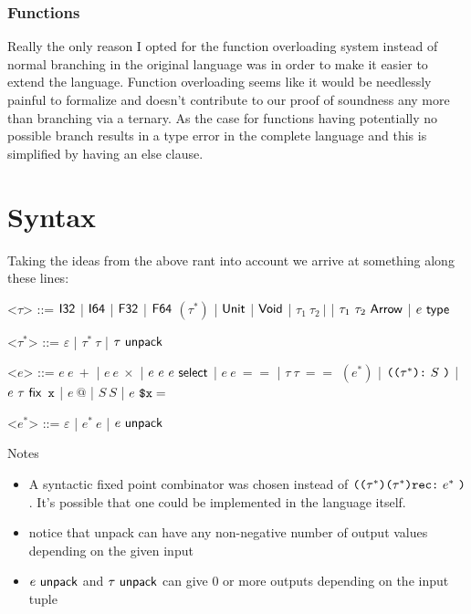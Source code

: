 \documentclass{article}
\begin{document}
\subsubsection{Functions}
Really the only reason I opted for the function overloading system instead of normal branching in the original language was in order to make it easier to extend the language.
Function overloading seems like it would be needlessly painful to formalize and doesn't contribute to our proof of soundness any more than branching via a ternary. As the case for functions having potentially no possible branch results in a type error in the complete language and this is simplified by having an else clause.

\section{Syntax}
Taking the ideas from the above rant into account we arrive at something along these lines:

\renewcommand{\grammarlabel}[2]{#1 \hfill#2}
\begin{grammar}
    <$\tau$> ::= $\mathsf{I32}$
    |    $\mathsf{I64}$
    |    $\mathsf{F32}$
    |    $\mathsf{F64}$
    \alt $(\tau^*)$
    |    $\mathsf{Unit}$
    |    $\mathsf{Void}$
    |    $\tau_1~ \tau_2~ \texttt{|}$
    |    $\tau_1 ~ \tau_2 ~ \mathsf{Arrow}$
    |    $e ~ \mathsf{type}$
        
    <$\tau^*$> ::= $\varepsilon$ | $\tau^* ~ \tau$ | $\tau ~ \mathsf{unpack}$

    <$e$> ::= $e~ e~ +$
    |    $e~ e~ \times$
    |    $e ~ e ~ e ~ \mathsf{select} $
    |    $e~ e~ ==$
    |    $\tau~ \tau~ ==$
    \alt $(e^*)$
    |    $\texttt{((} \tau^* \texttt{):} ~ S ~ \texttt{)}$
    |    $e ~ \tau ~ \mathsf{fix}$
    \alt $\texttt{x}$
    |    $e~ \textbf{@} $
    |    $S~ S$
    |    $e~ \texttt{\$x} =$

    <$e^*$> ::= $\varepsilon$ | $e^* ~ e$ | $e ~ \mathsf{unpack}$
\end{grammar}

Notes
\begin{itemize}
    \item A syntactic fixed point combinator was chosen instead of $\texttt{((} \tau^* \texttt{)(} \tau^* \texttt{)rec:} ~ e^* ~ \texttt{)}$. It's possible that one could be implemented in the language itself.
    \item notice that unpack can have any non-negative number of output values depending on the given input
    \item $e ~ \mathsf{unpack}$ and $\tau ~ \mathsf{unpack}$ can give 0 or more outputs depending on the input tuple
\end{itemize}
\end{document}
